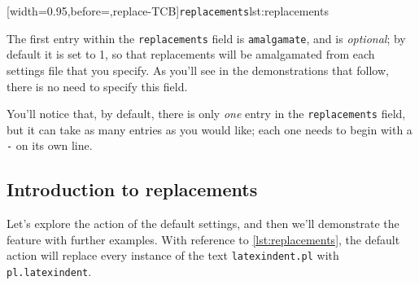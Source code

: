  [width=0.95\linewidth,before=\centering,replace-TCB]{\texttt{replacements}}{lst:replacements}

 The first entry within the \texttt{replacements} field is \texttt{amalgamate}, and is
 \emph{optional}; by default it is set to 1, so that replacements will be amalgamated from
 each settings file that you specify. As you'll see in the demonstrations that follow,
 there is no need to specify this field.

 You'll notice that, by default, there is only \emph{one} entry in the
 \texttt{replacements} field, but it can take as many entries as you would like; each one
 needs to begin with a \texttt{-} on its own line.

\subsection{Introduction to replacements}
 Let's explore the action of the default settings, and then we'll demonstrate the feature
 with further examples. With reference to \cref{lst:replacements}, the default action will
 replace every instance of the text \texttt{latexindent.pl} with \texttt{pl.latexindent}.

